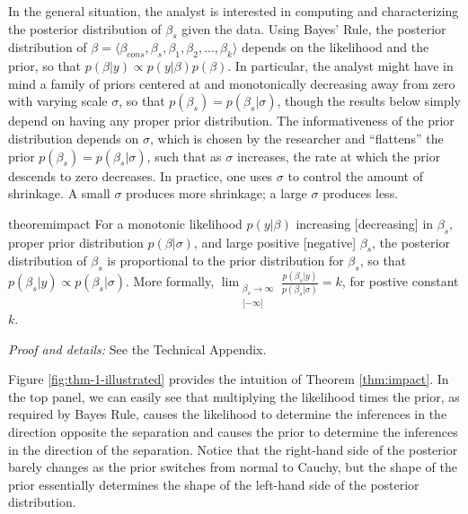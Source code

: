 \documentclass[12pt]{article}
\begin{document}
In the general situation, the analyst is interested in computing and characterizing the posterior distribution of $\beta_s$ given the data. 
Using Bayes' Rule, the posterior distribution of $\beta = \langle \beta_{cons}, \beta_{s}, \beta_1, \beta_2, ..., \beta_k \rangle$ depends on the likelihood and the prior, so that $p(\beta | y) \propto p(y|\beta)p(\beta)$. 
In particular, the analyst might have in mind a family of priors centered at and monotonically decreasing away from zero with varying scale $\sigma$, so that $p(\beta_s) = p(\beta_s | \sigma)$, though the results below simply depend on having any proper prior distribution. 
The informativeness of the prior distribution depends on $\sigma$, which is chosen by the researcher and ``flattens'' the prior $p(\beta_s) = p(\beta_s | \sigma)$, such that as $\sigma$ increases, the rate at which the prior descends to zero decreases. In practice, one uses $\sigma$ to control the amount of shrinkage. A small $\sigma$ produces more shrinkage; a large $\sigma$ produces less.

\begin{restatable}{theorem}{impact}\label{thm:impact}
For a monotonic likelihood $p(y | \beta)$ increasing [decreasing] in $\beta_s$, proper prior distribution $p(\beta | \sigma)$, and large positive [negative] $\beta_s$, the posterior distribution of $\beta_s$ is proportional to the prior distribution for $\beta_s$, so that $p(\beta_s | y) \propto p(\beta_s | \sigma)$. 
More formally, $\displaystyle \lim _{\substack{\beta_s \to \infty\\ \lbrack -\infty \rbrack}} \frac{p(\beta_s | y)}{p(\beta_s | \sigma)} = k$, for postive constant $k$.
\end{restatable}

\noindent \textit{Proof and details:} See the Technical Appendix.

Figure \ref{fig:thm-1-illustrated} provides the intuition of Theorem \ref{thm:impact}. In the top panel, we can easily see that multiplying the likelihood times the prior, as required by Bayes Rule, causes the likelihood to determine the inferences in the direction opposite the separation and causes the prior to determine the inferences in the direction of the separation. Notice that the right-hand side of the posterior barely changes as the prior switches from normal to Cauchy, but the shape of the prior essentially determines the shape of the left-hand side of the posterior distribution.
\end{document}
